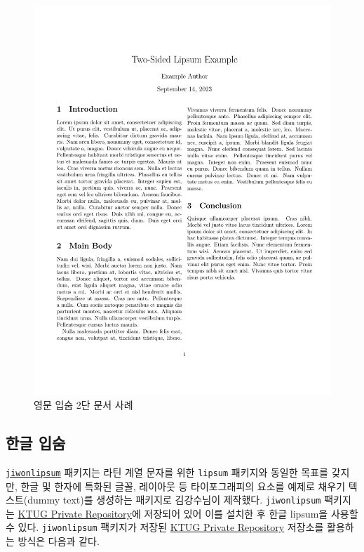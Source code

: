 \documentclass[
  letterpaper,
]{book}
\begin{document}
\begin{figure}

{\centering \includegraphics{images/pdf_ipsum_eng.jpg}

}

\caption{영문 입숨 2단 문서 사례}

\end{figure}

\hypertarget{korean-lipsum}{%
\subsection{한글 입숨}\label{korean-lipsum}}

\href{http://wiki.ktug.org/wiki/wiki.php/jiwonlipsum}{\texttt{jiwonlipsum}}
패키지는 라틴 계열 문자를 위한 \texttt{lipsum} 패키지와 동일한 목표를
갖지만, 한글 및 한자에 특화된 글꼴, 레이아웃 등 타이포그래피의 요소를
예제로 채우기 텍스트(dummy text)를 생성하는 패키지로 김강수님이
제작했다. \texttt{jiwonlipsum} 팩키지는
\href{http://wiki.ktug.org/wiki/wiki.php/KtugPrivateRepository}{KTUG
Private Repository}에 저장되어 있어 이를 설치한 후 한글 lipsum을 사용할
수 있다. \texttt{jiwonlipsum} 팩키지가 저장된
\href{http://wiki.ktug.org/wiki/wiki.php/KtugPrivateRepository}{KTUG
Private Repository} 저장소를 활용하는 방식은 다음과 같다.
\end{document}
